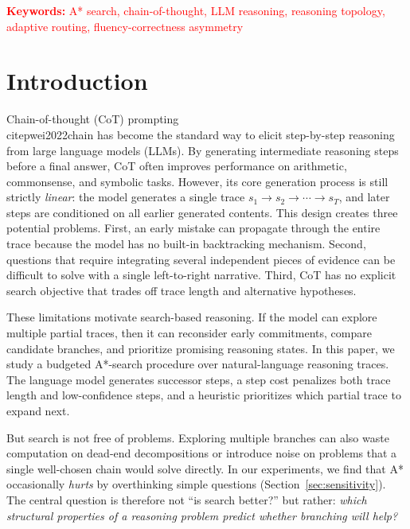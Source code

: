 \documentclass{article}
\begin{document}
\textcolor{red}{\textbf{Keywords:} A* search, chain-of-thought, LLM reasoning, reasoning topology, adaptive routing, fluency-correctness asymmetry}




\section{Introduction}
\label{sec:intro}

Chain-of-thought (CoT) prompting~\\citep{wei2022chain} has become the standard way to elicit step-by-step reasoning from large language models (LLMs). By generating intermediate reasoning steps before a final answer, CoT often improves performance on arithmetic, commonsense, and symbolic tasks. However, its core generation process is still strictly \emph{linear}: the model generates a single trace $s_1 \rightarrow s_2 \rightarrow \cdots \rightarrow s_T$, and later steps are conditioned on all earlier generated contents. This design creates three potential problems. First, an early mistake can propagate through the entire trace because the model has no built-in backtracking mechanism. Second, questions that require integrating several independent pieces of evidence can be difficult to solve with a single left-to-right narrative. Third, CoT has no explicit search objective that trades off trace length and alternative hypotheses.

These limitations motivate search-based reasoning. If the model can explore multiple partial traces, then it can reconsider early commitments, compare candidate branches, and prioritize promising reasoning states. In this paper, we study a budgeted A*-search procedure over natural-language reasoning traces. The language model generates successor steps, a step cost penalizes both trace length and low-confidence steps, and a heuristic prioritizes which partial trace to expand next.

But search is not free of problems. Exploring multiple branches can also waste computation on dead-end decompositions or introduce noise on problems that a single well-chosen chain would solve directly. In our experiments, we find that A* occasionally \emph{hurts} by overthinking simple questions (Section~\ref{sec:sensitivity}). The central question is therefore not ``is search better?'' but rather: \emph{which structural properties of a reasoning problem predict whether branching will help?}
\end{document}
